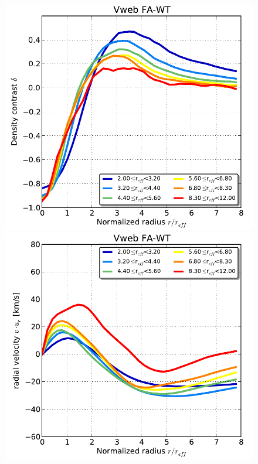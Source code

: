 \documentclass[a4,useAMS,usenatbib,usegraphicx]{latex/mn2e}
\begin{document}
\begin{flushleft}
\begin{figure}
  
  \includegraphics[trim = 1mm 0mm 5mm 0mm, clip, keepaspectratio=true,
  width=0.24\textheight]{./figures/voids_density_VwebFAG1.pdf}
  \includegraphics[trim = 1mm 0mm 5mm 0mm, clip, keepaspectratio=true,
  width=0.24\textheight]{./figures/voids_velocity_VwebFAG1.pdf}

\end{figure}
\end{flushleft}
\end{document}
